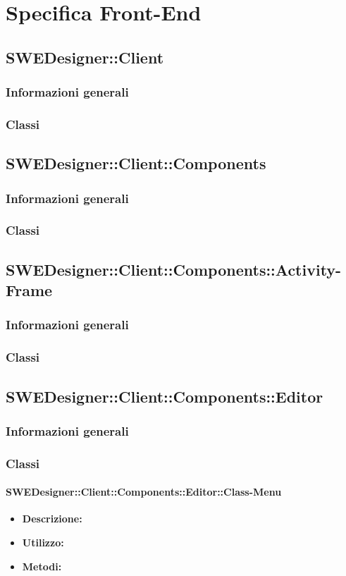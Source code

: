 \section{Specifica Front-End}
	\subsection{SWEDesigner::Client}
		\subsubsection{Informazioni generali}
		\subsubsection{Classi}
	\subsection{SWEDesigner::Client::Components}
		\subsubsection{Informazioni generali}
		\subsubsection{Classi}
	\subsection{SWEDesigner::Client::Components::Activity-Frame}
		\subsubsection{Informazioni generali}
		\subsubsection{Classi}
	\subsection{SWEDesigner::Client::Components::Editor}
		\subsubsection{Informazioni generali}
		\subsubsection{Classi}
			\paragraph{SWEDesigner::Client::Components::Editor::Class-Menu}
				\begin{itemize}
          			\item \textbf{Descrizione:}\\
          			\item \textbf{Utilizzo:}\\
          			\item \textbf{Metodi:}\\
          		\end{itemize}
